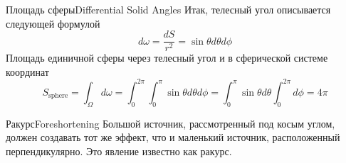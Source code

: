 \documentclass{beamer}
\begin{document}
	\begin{frame}{Площадь сферы}{Differential Solid Angles}
		Итак, телесный угол описывается следующей формулой
		\[
			d \omega = \frac{d S}{ r^2} =	\sin \theta  d \theta d \phi
		\]
		Площадь единичной сферы через телесный угол и в сферической системе координат
		\[
			S_\text{sphere} = \int_{\Omega} d \omega 
			= 
			\int_{0}^{2\pi}\int_{0}^{\pi} \sin \theta  d \theta d \phi
			= 
			\int_{0}^{\pi} \sin \theta d \theta \int_{0}^{2\pi} d \phi
			=
			4 \pi
		\]

	\end{frame}

	\begin{frame}{Ракурс}{Foreshortening}
		Большой источник, рассмотренный под косым углом, должен создавать тот же эффект, что и маленький источник, расположенный перпендикулярно. Это явление известно как ракурс.

	\end{frame}
	
\end{document}
